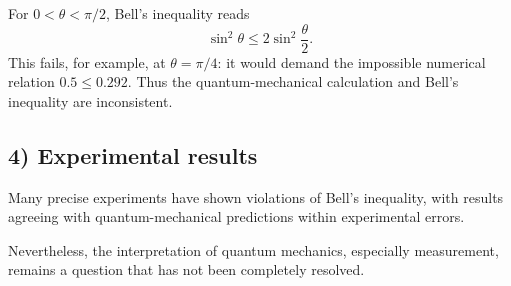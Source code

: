 For $0<\theta<\pi/2$, Bell's inequality reads
\begin{equation}
\sin^2\theta\le2\sin^2\frac\theta2.
\end{equation}
This fails, for example, at $\theta=\pi/4$: it would demand the impossible numerical relation $0.5\le0.292$. Thus the quantum-mechanical calculation and Bell's inequality are inconsistent.

\subsection*{4) Experimental results}
Many precise experiments have shown violations of Bell's inequality, with results agreeing with quantum-mechanical predictions within experimental errors.

Nevertheless, the interpretation of quantum mechanics, especially measurement, remains a question that has not been completely resolved.

